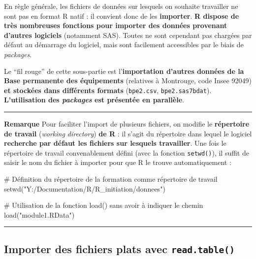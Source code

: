 \documentclass[12pt,twosided, notitlepage]{book}
\newenvironment{Shaded}{}{}
\newcommand{\KeywordTok}[1]{\textcolor[rgb]{0.00,0.00,1.00}{#1}}
\newcommand{\StringTok}[1]{\textcolor[rgb]{0.00,0.50,0.50}{#1}}
\newcommand{\CommentTok}[1]{\textcolor[rgb]{0.00,0.50,0.00}{#1}}
\newcommand{\NormalTok}[1]{#1}
\renewenvironment{Shaded}{\begin{snugshade}}{\end{snugshade}}
\begin{document}
En règle générale, les fichiers de données sur lesquels on souhaite
travailler ne sont pas en format R natif : il convient donc de les
\textbf{importer}. \textbf{R dispose de très nombreuses fonctions pour
importer des données provenant d'autres logiciels} (notamment SAS).
Toutes ne sont cependant pas chargées par défaut au démarrage du
logiciel, mais sont facilement accessibles par le biais de
\emph{packages}.

Le \enquote{fil rouge} de cette sous-partie est l'\textbf{importation
d'autres données de la Base permanente des équipements} (relatives à
Montrouge, code Insee 92049) \textbf{et stockées dans différents
formats} (\texttt{bpe2.csv}, \texttt{bpe2.sas7bdat}).
\textbf{L'utilisation des \emph{packages} est présentée en parallèle}.

\begin{center}\rule{0.5\linewidth}{\linethickness}\end{center}

\textbf{Remarque} Pour faciliter l'import de plusieurs fichiers, on
modifie le \textbf{répertoire de travail} (\emph{working directory})
\textbf{de R} : il s'agit du répertoire dans lequel le logiciel
\textbf{recherche par défaut les fichiers sur lesquels travailler}. Une
fois le répertoire de travail convenablement défini (avec la fonction
\texttt{setwd()}), il suffit de saisir le
nom du fichier à importer pour que R le trouve automatiquement
:

\begin{Shaded}
\begin{Highlighting}[]
\CommentTok{# Définition du répertoire de la formation comme répertoire de travail}
\KeywordTok{setwd}\NormalTok{(}\StringTok{"Y:/Documentation/R/R_initiation/donnees"}\NormalTok{)}

\CommentTok{# Utilisation de la fonction load() sans avoir à indiquer le chemin}
\KeywordTok{load}\NormalTok{(}\StringTok{"module1.RData"}\NormalTok{)}
\end{Highlighting}
\end{Shaded}

\begin{center}\rule{0.5\linewidth}{\linethickness}\end{center}

\subsection{\texorpdfstring{Importer des fichiers plats avec
\texttt{read.table()}}{Importer des fichiers plats avec read.table()}}\label{importer-des-fichiers-plats-avec-read.table}
\end{document}
